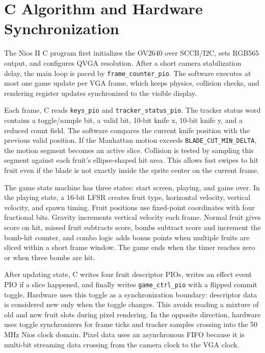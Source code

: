 \documentclass[10pt]{article}
\begin{document}
\section{C Algorithm and Hardware Synchronization}

The Nios II C program first initializes the OV2640 over SCCB/I2C, sets RGB565 output, and configures QVGA resolution. After a short camera stabilization delay, the main loop is paced by \texttt{frame\_counter\_pio}. The software executes at most one game update per VGA frame, which keeps physics, collision checks, and rendering register updates synchronized to the visible display.

Each frame, C reads \texttt{keys\_pio} and \texttt{tracker\_status\_pio}. The tracker status word contains a toggle/sample bit, a valid bit, 10-bit knife x, 10-bit knife y, and a reduced count field. The software compares the current knife position with the previous valid position. If the Manhattan motion exceeds \texttt{BLADE\_CUT\_MIN\_DELTA}, the motion segment becomes an active slice. Collision is tested by sampling this segment against each fruit's ellipse-shaped hit area. This allows fast swipes to hit fruit even if the blade is not exactly inside the sprite center on the current frame.

The game state machine has three states: start screen, playing, and game over. In the playing state, a 16-bit LFSR creates fruit type, horizontal velocity, vertical velocity, and spawn timing. Fruit positions use fixed-point coordinates with four fractional bits. Gravity increments vertical velocity each frame. Normal fruit gives score on hit, missed fruit subtracts score, bombs subtract score and increment the bomb-hit counter, and combo logic adds bonus points when multiple fruits are sliced within a short frame window. The game ends when the timer reaches zero or when three bombs are hit.

After updating state, C writes four fruit descriptor PIOs, writes an effect event PIO if a slice happened, and finally writes \texttt{game\_ctrl\_pio} with a flipped commit toggle. Hardware uses this toggle as a synchronization boundary: descriptor data is considered new only when the toggle changes. This avoids reading a mixture of old and new fruit slots during pixel rendering. In the opposite direction, hardware uses toggle synchronizers for frame ticks and tracker samples crossing into the 50 MHz Nios clock domain. Pixel data uses an asynchronous FIFO because it is multi-bit streaming data crossing from the camera clock to the VGA clock.
\end{document}

